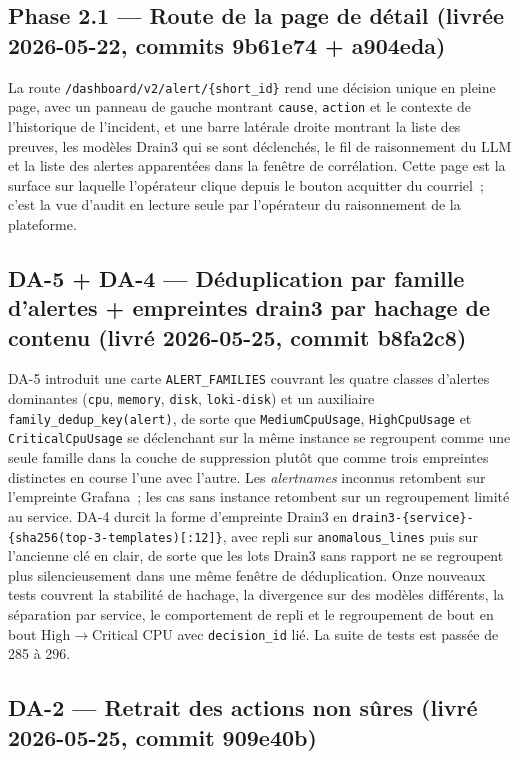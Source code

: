\documentclass[11pt,a4paper,oneside]{report}
\begin{document}
\subsection{Phase 2.1 --- Route de la page de détail (livrée 2026-05-22, commits 9b61e74 + a904eda)}

La route \texttt{/dashboard/v2/alert/\{short\_id\}} rend une
décision unique en pleine page, avec un panneau de gauche montrant
\texttt{cause}, \texttt{action} et le contexte de l'historique de
l'incident, et une barre latérale droite montrant la liste des
preuves, les modèles Drain3 qui se sont déclenchés, le fil de
raisonnement du LLM et la liste des alertes apparentées dans la
fenêtre de corrélation. Cette page est la surface sur laquelle
l'opérateur clique depuis le bouton acquitter du courriel~; c'est la
vue d'audit en lecture seule par l'opérateur du raisonnement de la
plateforme.

\subsection{DA-5 + DA-4 --- Déduplication par famille d'alertes + empreintes drain3 par hachage de contenu (livré 2026-05-25, commit b8fa2c8)}

DA-5 introduit une carte \texttt{ALERT\_FAMILIES} couvrant les
quatre classes d'alertes dominantes (\texttt{cpu}, \texttt{memory},
\texttt{disk}, \texttt{loki-disk}) et un auxiliaire
\texttt{family\_dedup\_key(alert)}, de sorte que
\texttt{MediumCpuUsage}, \texttt{HighCpuUsage} et
\texttt{CriticalCpuUsage} se déclenchant sur la même instance se
regroupent comme une seule famille dans la couche de suppression
plutôt que comme trois empreintes distinctes en course l'une avec
l'autre. Les \emph{alertnames} inconnus retombent sur l'empreinte
Grafana~; les cas sans instance retombent sur un regroupement
limité au service. DA-4 durcit la forme d'empreinte Drain3 en
\texttt{drain3-\{service\}-\{sha256(top-3-templates)[:12]\}}, avec
repli sur \texttt{anomalous\_lines} puis sur l'ancienne clé en
clair, de sorte que les lots Drain3 sans rapport ne se regroupent
plus silencieusement dans une même fenêtre de déduplication. Onze
nouveaux tests couvrent la stabilité de hachage, la divergence sur
des modèles différents, la séparation par service, le comportement
de repli et le regroupement de bout en bout High$\to$Critical CPU
avec \texttt{decision\_id} lié. La suite de tests est passée de
285 à 296.

\subsection{DA-2 --- Retrait des actions non sûres (livré 2026-05-25, commit 909e40b)}
\end{document}

